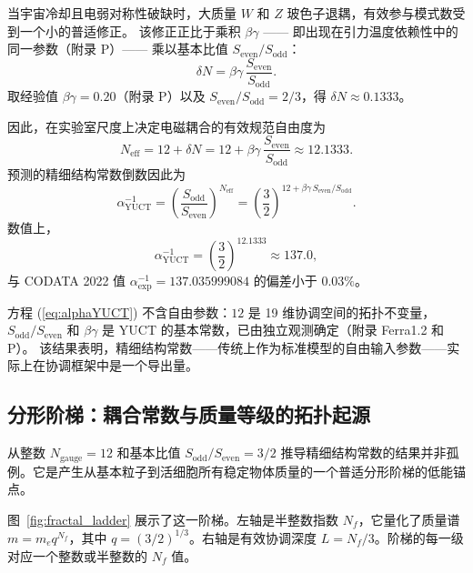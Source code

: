 \documentclass[12pt,a4paper]{article}
\begin{document}
	当宇宙冷却且电弱对称性破缺时，大质量 \(W\) 和 \(Z\) 玻色子退耦，有效参与模式数受到一个小的普适修正。  
	该修正正比于乘积 \(\beta\gamma\) —— 即出现在引力温度依赖性中的同一参数（附录 P）—— 乘以基本比值 \(S_{\mathrm{even}}/S_{\mathrm{odd}}\)：
	\begin{equation}
		\delta N = \beta\gamma \, \frac{S_{\mathrm{even}}}{S_{\mathrm{odd}}} .
		\label{eq:deltaN}
	\end{equation}
	取经验值 \(\beta\gamma = 0.20\)（附录 P）以及 \(S_{\mathrm{even}}/S_{\mathrm{odd}} = 2/3\)，得 \(\delta N \approx 0.1333\)。
	
	因此，在实验室尺度上决定电磁耦合的有效规范自由度为
	\begin{equation}
		N_{\mathrm{eff}} = 12 + \delta N = 12 + \beta\gamma\,\frac{S_{\mathrm{even}}}{S_{\mathrm{odd}}} \approx 12.1333 .
	\end{equation}
	预测的精细结构常数倒数因此为
	\begin{equation}
		\boxed{\alpha^{-1}_{\mathrm{YUCT}} = \left( \frac{S_{\mathrm{odd}}}{S_{\mathrm{even}}} \right)^{N_{\mathrm{eff}}}
			= \left( \frac{3}{2} \right)^{12 + \beta\gamma\,S_{\mathrm{even}}/S_{\mathrm{odd}}} } .
		\label{eq:alphaYUCT}
	\end{equation}
	数值上，
	\[
	\alpha^{-1}_{\mathrm{YUCT}} = \left( \frac{3}{2} \right)^{12.1333} \approx 137.0 ,
	\]
	与 CODATA 2022 值 \(\alpha^{-1}_{\mathrm{exp}} = 137.035999084\) 的偏差小于 \(0.03\%\)。
	
	方程 (\ref{eq:alphaYUCT}) 不含自由参数：\(12\) 是 19 维协调空间的拓扑不变量，\(S_{\mathrm{odd}}/S_{\mathrm{even}}\) 和 \(\beta\gamma\) 是 YUCT 的基本常数，已由独立观测确定（附录 Ferra1.2 和 P）。  
	该结果表明，精细结构常数——传统上作为标准模型的自由输入参数——实际上在协调框架中是一个导出量。
	
	\subsection{分形阶梯：耦合常数与质量等级的拓扑起源}
	\label{sec:fractal_ladder}
	
	从整数 \(N_{\mathrm{gauge}}=12\) 和基本比值 \(S_{\mathrm{odd}}/S_{\mathrm{even}}=3/2\) 推导精细结构常数的结果并非孤例。它是产生从基本粒子到活细胞所有稳定物体质量的一个普适分形阶梯的低能锚点。
	
	图~\ref{fig:fractal_ladder} 展示了这一阶梯。左轴是半整数指数 \(N_f\)，它量化了质量谱 \(m = m_e q^{N_f}\)，其中 \(q = (3/2)^{1/3}\)。右轴是有效协调深度 \(L = N_f/3\)。阶梯的每一级对应一个整数或半整数的 \(N_f\) 值。
	
\end{document}
